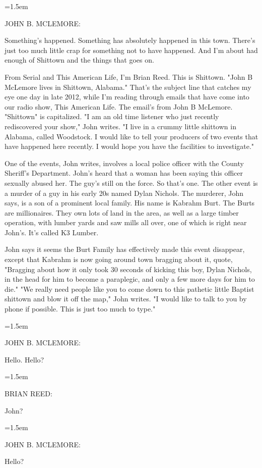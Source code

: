 \documentclass[10pt,a4paper]{article}
\newcommand{\speakerlabel}[1]{{\plantin\color{speakerblue}\MakeUppercase{#1}:}}
\newenvironment{speech}[1]{%
		\par\medskip
		\begin{list}{}{%
			\leftmargin=1.5em
			\rightmargin=0pt
			\topsep=0pt
			\partopsep=0pt
			\parsep=0.5\baselineskip
			\itemsep=0pt}%
		\item\speakerlabel{#1}\enspace\ignorespaces
	}{\end{list}}
\newenvironment{narration}[1]{%
		\par\medskip\noindent\speakerlabel{#1}\enspace\ignorespaces
	}{\par\medskip}
\newcommand{\stage}[1]{\par\smallskip\noindent{\itshape\color{stagegrey}[#1]}\par\smallskip}
\begin{document}
\begin{speech}{JOHN B. McLEMORE}
Something's happened. Something has absolutely happened in this town. There's just too much little crap for something not to have happened. And I'm about had enough of Shittown and the things that goes on.
\end{speech}
\begin{narration}{BRIAN REED}
From Serial and This American Life, I'm Brian Reed. This is Shittown. "John B McLemore lives in Shittown, Alabama." That's the subject line that catches my eye one day in late 2012, while I'm reading through emails that have come into our radio show, This American Life. The email's from John B McLemore. "Shittown" is capitalized. "I am an old time listener who just recently rediscovered your show," John writes. "I live in a crummy little shittown in Alabama, called Woodstock. I would like to tell your producers of two events that have happened here recently. I would hope you have the facilities to investigate."

One of the events, John writes, involves a local police officer with the County Sheriff's Department. John's heard that a woman has been saying this officer sexually abused her. The guy's still on the force. So that's one. The other event is a murder of a guy in his early 20s named Dylan Nichols. The murderer, John says, is a son of a prominent local family. His name is Kabrahm Burt. The Burts are millionaires. They own lots of land in the area, as well as a large timber operation, with lumber yards and saw mills all over, one of which is right near John's. It's called K3 Lumber.

John says it seems the Burt Family has effectively made this event disappear, except that Kabrahm is now going around town bragging about it, quote, "Bragging about how it only took 30 seconds of kicking this boy, Dylan Nichols, in the head for him to become a paraplegic, and only a few more days for him to die." "We really need people like you to come down to this pathetic little Baptist shittown and blow it off the map," John writes. "I would like to talk to you by phone if possible. This is just too much to type."
\end{narration}
\stage{DIALING}
\begin{speech}{JOHN B. McLEMORE}
Hello. Hello?
\end{speech}
\begin{speech}{BRIAN REED}
John?
\end{speech}
\begin{speech}{JOHN B. McLEMORE}
Hello?
\end{speech}
\end{document}
